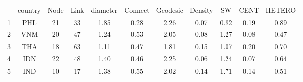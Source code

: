 \begin{table} 
    \begin{tabular}{ c c c c c c c c c c c }
         & country & Node & Link & diameter & Connect & Geodesic & Density & SW & CENT & HETERO \\ 
        1 & PHL & 21 & 33 & 1.85 & 0.28 & 2.26 & 0.07 & 0.82 & 0.19 & 0.89 \\ 
        2 & VNM & 20 & 47 & 1.24 & 0.53 & 2.05 & 0.08 & 1.27 & 0.08 & 0.47 \\ 
        3 & THA & 18 & 63 & 1.11 & 0.47 & 1.81 & 0.15 & 1.07 & 0.20 & 0.70 \\ 
        4 & IDN & 22 & 48 & 1.40 & 0.46 & 2.25 & 0.06 & 1.24 & 0.07 & 0.64 \\ 
        5 & IND & 10 & 17 & 1.38 & 0.55 & 2.02 & 0.14 & 1.71 & 0.14 & 0.51 \\ 
    \end{tabular} 
\end{table}